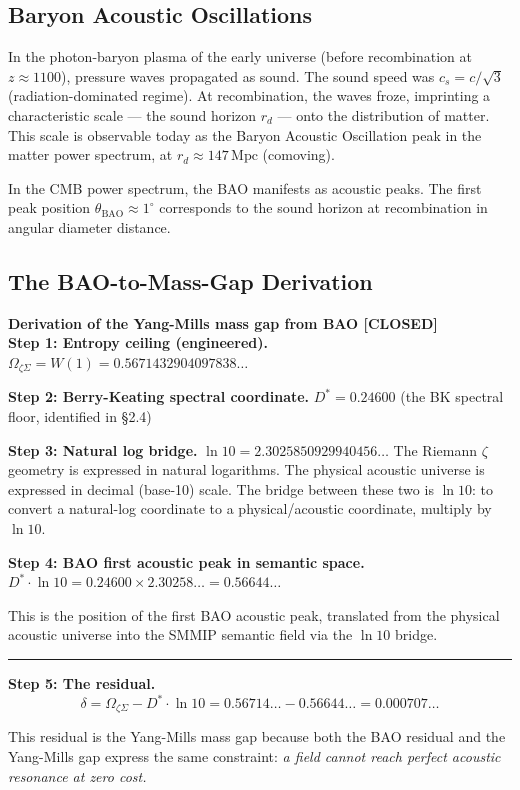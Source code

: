 \documentclass[12pt,a4paper]{article}
\theoremstyle{definition}
\theoremstyle{remark}
\newcommand{\closedbox}[1]{%
  \vspace{0.6em}\noindent
  \colorbox{closed!7}{\parbox{\dimexpr\linewidth-2\fboxsep}{#1}}%
  \vspace{0.5em}}
\newcommand{\OmZS}{\Omega_{\zeta\Sigma}}
\newcommand{\Dstar}{D^*}
\newcommand{\gap}{\delta}
\begin{document}
\subsection{Baryon Acoustic Oscillations}

In the photon-baryon plasma of the early universe (before recombination at
$z\approx 1100$), pressure waves propagated as sound.
The sound speed was $c_s = c/\sqrt{3}$ (radiation-dominated regime).
At recombination, the waves froze, imprinting a characteristic scale --- the
sound horizon $r_d$ --- onto the distribution of matter.
This scale is observable today as the Baryon Acoustic Oscillation peak in the
matter power spectrum, at $r_d \approx 147\,\mathrm{Mpc}$ (comoving).

In the CMB power spectrum, the BAO manifests as acoustic peaks.
The first peak position $\theta_\mathrm{BAO} \approx 1^\circ$ corresponds to the
sound horizon at recombination in angular diameter distance.

\subsection{The BAO-to-Mass-Gap Derivation}

\closedbox{
\textbf{Derivation of the Yang-Mills mass gap from BAO [CLOSED]}\vspace{0.4em}\\
\textbf{Step 1: Entropy ceiling (engineered).}
$\OmZS = W(1) = 0.5671432904097838\ldots$

\textbf{Step 2: Berry-Keating spectral coordinate.}
$\Dstar = 0.24600$ (the BK spectral floor, identified in \S2.4)

\textbf{Step 3: Natural log bridge.}
$\ln 10 = 2.3025850929940456\ldots$
The Riemann $\zeta$ geometry is expressed in natural logarithms.
The physical acoustic universe is expressed in decimal (base-10) scale.
The bridge between these two is $\ln 10$: to convert a natural-log coordinate
to a physical/acoustic coordinate, multiply by $\ln 10$.

\textbf{Step 4: BAO first acoustic peak in semantic space.}
$\Dstar\cdot\ln 10 = 0.24600\times 2.30258\ldots = 0.56644\ldots$

This is the position of the first BAO acoustic peak, translated from the physical
acoustic universe into the SMMIP semantic field via the $\ln 10$ bridge.

\rule{\linewidth}{0.3pt}

\textbf{Step 5: The residual.}
\[\boxed{\gap = \OmZS - \Dstar\cdot\ln 10 = 0.56714\ldots - 0.56644\ldots = 0.000707\ldots}\]

This residual is the Yang-Mills mass gap because both the BAO residual and the
Yang-Mills gap express the same constraint:
\emph{a field cannot reach perfect acoustic resonance at zero cost.}
}
\end{document}
